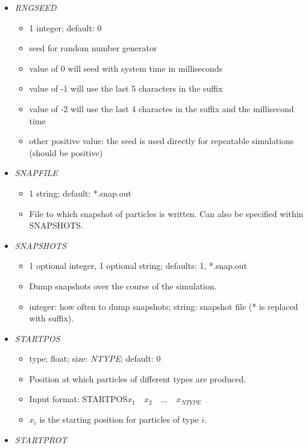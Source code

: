 \documentclass[12pt]{article}
\begin{document}
\begin{itemize}
\begin{itemize}
	\item Input format: REGPOS\quad$x_{1}\quad x_{2}\quad...\quad x_{NREG}$
	\item $x_{i}$ is the position of region $i$.
\end{itemize}
%    
\item {\it RNGSEED}
\begin{itemize}
	\item 1 integer; default: 0
	\item seed for random number generator
	\item value of 0 will seed with system time in milliseconds
	\item value of -1 will use the last 5 characters in the suffix
	\item value of -2 will use the last 4 charactes in the suffix and the millisecond time
	\item other positive value: the seed is used directly for repeatable simulations (should be positive)
\end{itemize}
%
\item {\it SNAPFILE}
\begin{itemize}
	\item 1 string; default: *.snap.out
	\item File to which snapshot of particles is written. Can also be specified within SNAPSHOTS.
\end{itemize}
%
\item {\it SNAPSHOTS}
  \begin{itemize}
    \item 1 optional integer, 1 optional string; defaults: 1, *.snap.out 
    \item Dump snapshots over the course of the simulation.
    \item integer: how often to dump snapshots; string: snapshot file (* is replaced with suffix).
   \end{itemize}
%
\item {\it STARTPOS}
\begin{itemize}
	\item  type: float; size: \textit{NTYPE}; default: 0
	\item Position at which particles of different types are produced.
	\item Input format: STARTPOS\quad$x_{1}\quad x_{2}\quad...\quad x_{NTYPE}$
	\item $x_{i}$ is the starting position for particles of type $i$.
\end{itemize}
%
\item {\it STARTPROT}

\end{itemize}
\end{document}
